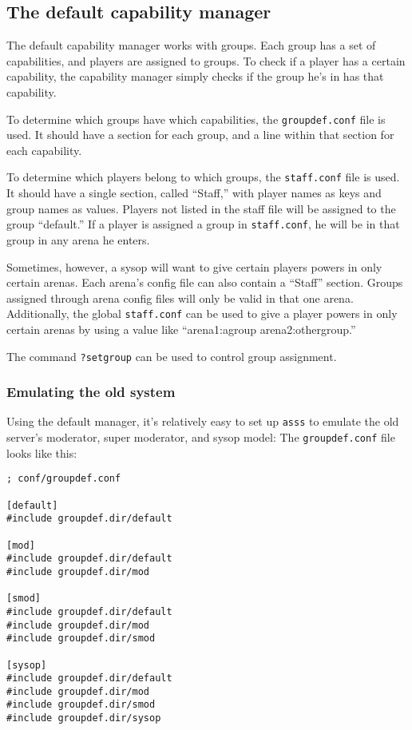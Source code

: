 \documentclass{article}
\newcommand{\asss}{\texttt{asss}}
\begin{document}
\subsection{The default capability manager}

The default capability manager works with groups. Each group has a set
of capabilities, and players are assigned to groups. To check if a
player has a certain capability, the capability manager simply checks if
the group he's in has that capability.

To determine which groups have which capabilities, the
\verb/groupdef.conf/ file is used. It should have a section for each
group, and a line within that section for each capability.

To determine which players belong to which groups, the \verb/staff.conf/
file is used. It should have a single section, called ``Staff,'' with
player names as keys and group names as values. Players not listed in
the staff file will be assigned to the group ``default.'' If a player is
assigned a group in \verb/staff.conf/, he will be in that group in any
arena he enters.

Sometimes, however, a sysop will want to give certain players powers in
only certain arenas. Each arena's config file can also contain a
``Staff'' section. Groups assigned through arena config files will only
be valid in that one arena. Additionally, the global \verb/staff.conf/
can be used to give a player powers in only certain arenas by using a
value like ``arena1:agroup arena2:othergroup.''

The command \verb/?setgroup/ can be used to control group assignment.

\subsubsection{Emulating the old system}
Using the default manager, it's relatively easy to set up \asss{} to
emulate the old server's moderator, super moderator, and sysop model:
The \verb/groupdef.conf/ file looks like this:

\begin{verbatim}
; conf/groupdef.conf

[default]
#include groupdef.dir/default

[mod]
#include groupdef.dir/default
#include groupdef.dir/mod

[smod]
#include groupdef.dir/default
#include groupdef.dir/mod
#include groupdef.dir/smod

[sysop]
#include groupdef.dir/default
#include groupdef.dir/mod
#include groupdef.dir/smod
#include groupdef.dir/sysop
\end{verbatim}
\end{document}
